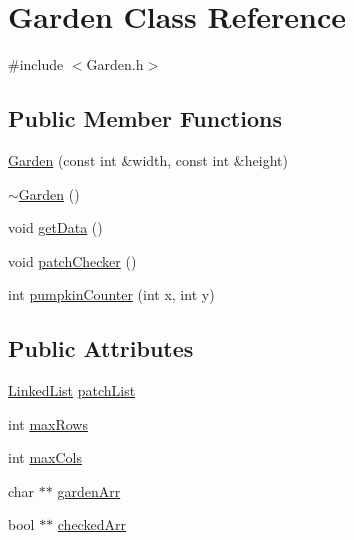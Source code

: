 \hypertarget{class_garden}{\section{Garden Class Reference}
\label{class_garden}
}


{\ttfamily \#include $<$Garden.\-h$>$}

\subsection*{Public Member Functions}
\begin{DoxyCompactItemize}
\item 
\hyperlink{class_garden_acd32da473d81e82df420e36f1b1fa662}{Garden} (const int \&width, const int \&height)
\item 
\hyperlink{class_garden_a8af45059d355c1ec6f76399677d777c9}{$\sim$\-Garden} ()
\item 
void \hyperlink{class_garden_ad3d17197778531704ef49fcd0f76f29c}{get\-Data} ()
\item 
void \hyperlink{class_garden_a8142f169b5db750e6a84c14714922309}{patch\-Checker} ()
\item 
int \hyperlink{class_garden_ae7938b343cd7ed89dcc0c01ebb06d726}{pumpkin\-Counter} (int x, int y)
\end{DoxyCompactItemize}
\subsection*{Public Attributes}
\begin{DoxyCompactItemize}
\item 
\hyperlink{class_linked_list}{Linked\-List} \hyperlink{class_garden_a059e09ed3387ab07585fda476e8fc692}{patch\-List}
\item 
int \hyperlink{class_garden_adb64bd58fc94fc700ce160a0cd593109}{max\-Rows}
\item 
int \hyperlink{class_garden_a5b875de93ef430b149f490d4e5272ae1}{max\-Cols}
\item 
char $\ast$$\ast$ \hyperlink{class_garden_aa13f03bd07377e5740947041ec717051}{garden\-Arr}
\item 
bool $\ast$$\ast$ \hyperlink{class_garden_ae370405ce67afc5e08b33462dc157ca0}{checked\-Arr}
\end{DoxyCompactItemize}



